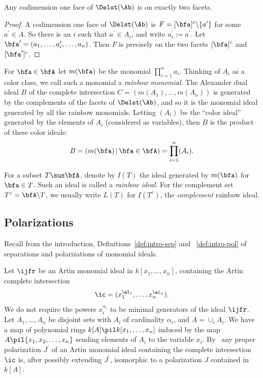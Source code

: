 \begin{lemm} \label{lem:link-cdto}
  Any codimension one face of $\Delst(\Ab)$ is on exactly two facets.
\end{lemm}

\begin{proof} A codimension one face of $\Delst(\Ab)$ is
  $F = [\bfa]^c \backslash \{a^\prime \}$ for some $a^\prime \in A$.
  So there is an $i$ such that $a^\prime \in A_i$, and write $a_i^\prime
:= a^\prime$. Let $\bfa^\prime = (a_1, \ldots, a_i^\prime, \ldots, a_n)$.
  Then $F$ is precisely on the two facets $[\bfa]^c$ and $[\bfa^\prime]^c$.
\end{proof}


For $\bfa \in \bfA$ let $m(\bfa)$ be the monomial 
$\prod_{i = 1}^n a_i$. Thinking
of $A_i$ as a color class, we call such a monomial a {\it rainbow
monomial}.  The Alexander dual ideal $B$ of the complete intersection
$C = (m(A_1), \ldots, m(A_n))$ is generated by the complements
of the facets of $\Delst(\Ab)$, and so it is the monomial
ideal generated by all the  rainbow monomials. Letting
$(A_i)$ be the ``color ideal'' generated by the elements of $A_i$ (considered
as variables), then $B$ is the product of these color ideals:
\[ B  = (m(\bfa) \, | \, \bfa \in \bfA) = \prod_{i = 1}^n(A_i). \]

\begin{defi}
For a subset $T \sus \bfA$, denote by $I(T)$ the ideal generated
by $m(\bfa)$ for $\bfa \in T$. Such an ideal is called a {\it rainbow ideal}.
For the complement set $T^c = \bfA \backslash T$, we
usually write $L(T)$ for $I(T^c)$, the {\it complement} rainbow ideal.
\end{defi}

\setcounter{subsection}{2}\setcounter{cdrthm}{5}
  \subsection{Polarizations}
  \label{subsec:pol}

  Recall from the introduction, Definitions~\ref{def:intro-sep} and
 ~\ref{def:intro-pol} of separations and polarizations of monomial ideals.

  Let $\ijfr$ be an Artin monomial ideal
  in $k[x_1, \ldots, x_n]$, containing the Artin complete
  intersection
  \[ \ic = (x_1^{\al_1}, \ldots, x_n^{\al_n}). \]
  We do not require the powers $x_i^{\alpha_i}$ 
  to be minimal generators of the ideal $\ijfr$. 
  Let $A_1, \ldots, A_n$ be disjoint sets with $A_i$ of cardinality $\alpha_i$,
  and $A = \cup_i A_i$.
We have a map of polynomial rings
  $k[A] \pil k[x_1, \ldots, x_n]$ induced by the map 
  $A \pil \{x_1,x_2, \ldots, x_n \}$ sending elements of $A_i$
  to the variable $x_i$.
  By~\cite[Remark 2.5]{AFL} any proper polarization $J^\prime$
  of an Artin monomial ideal
  containing the complete intersection $\ic$ is, after possibly
  extending $J^\prime$, isomorphic to a polarization $J$ contained in $k[A]$. 
  
